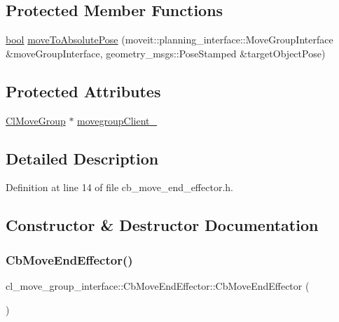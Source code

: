 \subsection*{Protected Member Functions}
\begin{DoxyCompactItemize}
\item 
\hyperlink{classbool}{bool} \hyperlink{classcl__move__group__interface_1_1CbMoveEndEffector_a533ec599a0e248f3cb024e9cdf148db2}{move\+To\+Absolute\+Pose} (moveit\+::planning\+\_\+interface\+::\+Move\+Group\+Interface \&move\+Group\+Interface, geometry\+\_\+msgs\+::\+Pose\+Stamped \&target\+Object\+Pose)
\end{DoxyCompactItemize}
\subsection*{Protected Attributes}
\begin{DoxyCompactItemize}
\item 
\hyperlink{classcl__move__group__interface_1_1ClMoveGroup}{Cl\+Move\+Group} $\ast$ \hyperlink{classcl__move__group__interface_1_1CbMoveEndEffector_a86583cb37788b461fc8bb38102a8c0ed}{movegroup\+Client\+\_\+}
\end{DoxyCompactItemize}


\subsection{Detailed Description}


Definition at line 14 of file cb\+\_\+move\+\_\+end\+\_\+effector.\+h.



\subsection{Constructor \& Destructor Documentation}
\mbox{\label{classcl__move__group__interface_1_1CbMoveEndEffector_a5bcaaff082b7d8039a4f491b2797776e}} 
\subsubsection{\texorpdfstring{Cb\+Move\+End\+Effector()}{CbMoveEndEffector()}\hspace{0.1cm}{\footnotesize\ttfamily [1/2]}}
{\footnotesize\ttfamily cl\+\_\+move\+\_\+group\+\_\+interface\+::\+Cb\+Move\+End\+Effector\+::\+Cb\+Move\+End\+Effector (\begin{DoxyParamCaption}{ }\end{DoxyParamCaption})}



